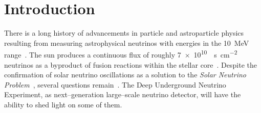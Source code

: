 \section{Introduction} \label{sec:INTRODUCTION}
There is a long history of advancements in particle and astroparticle physics resulting from measuring astrophysical neutrinos with energies in the \SI{10}{\mega\electronvolt} range~\cite{Ahmad2001,Abe2016}. The sun produces a continuous flux of roughly \SI{7e10}{\per\second\per\centi\meter\squared} neutrinos as a byproduct of fusion reactions within the stellar core~\cite{Vinyoles_2018}. Despite the confirmation of solar neutrino oscillations as a solution to the \textit{Solar Neutrino Problem}~\cite{PhysRevLett.65.2233}, several questions remain~\cite{Gann2021ndb}. The Deep Underground Neutrino Experiment, as next--generation large--scale neutrino detector, will have the ability to shed light on some of them.

